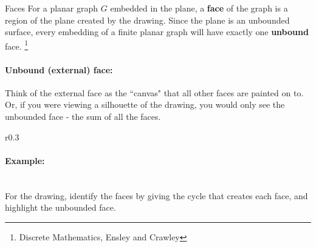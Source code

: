     \newpage

    \begin{intro}{Faces}
        For a planar graph $G$ embedded in the plane,
        a \textbf{face} of the graph is a region of the plane created
        by the drawing. Since the plane is an unbounded surface, every
        embedding of a finite planar graph will have exactly one
        \textbf{unbound} face.
        \footnote{Discrete Mathematics, Ensley and Crawley}

        \paragraph{Unbound (external) face:}
        Think of the external face as the ``canvas" that all other
        faces are painted on to. Or, if you were viewing a silhouette of
        the drawing, you would only see the unbounded face - the sum of
        all the faces.

        \begin{wrapfigure}{r}{0.3\textwidth}
            \begin{center}
            \end{center}
        \end{wrapfigure}
        
        \paragraph{Example:} ~\\
            For the drawing, identify the faces by giving the cycle that
            creates each face, and highlight the unbounded face.


\end{intro}
